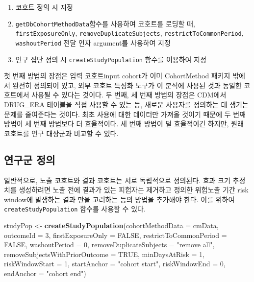 \documentclass[10.5pt]{book}
\newenvironment{Shaded}{\begin{snugshade}}{\end{snugshade}}
\newcommand{\KeywordTok}[1]{\textcolor[rgb]{0.13,0.29,0.53}{\textbf{#1}}}
\newcommand{\DataTypeTok}[1]{\textcolor[rgb]{0.13,0.29,0.53}{#1}}
\newcommand{\DecValTok}[1]{\textcolor[rgb]{0.00,0.00,0.81}{#1}}
\newcommand{\StringTok}[1]{\textcolor[rgb]{0.31,0.60,0.02}{#1}}
\newcommand{\OtherTok}[1]{\textcolor[rgb]{0.56,0.35,0.01}{#1}}
\newcommand{\NormalTok}[1]{#1}
\providecommand{\tightlist}{%
  \setlength{\itemsep}{0pt}\setlength{\parskip}{0pt}}
\theoremstyle{definition}
\theoremstyle{definition}
\theoremstyle{definition}
\theoremstyle{remark}
\begin{document}
\begin{enumerate}
\def\labelenumi{\arabic{enumi}.}
\tightlist
\item
  코호트 정의 시 지정
\item
  \texttt{getDbCohortMethodData}함수를 사용하여 코호트를 로딩할 때,
  \texttt{firstExposureOnly}, \texttt{removeDuplicateSubjects},
  \texttt{restrictToCommonPeriod}, \texttt{washoutPeriod} 전달 인자
  argument를 사용하여 지정
\item
  연구 집단 정의 시 \texttt{createStudyPopulation} 함수를 이용하여 지정
\end{enumerate}

첫 번째 방법의 장점은 입력 코호트input cohort가 이미 CohortMethod 패키지
밖에서 완전히 정의되어 있고, 외부 코호트 특성화 도구가 이 분석에 사용된
것과 동일한 코호트에서 사용될 수 있다는 것이다. 두 번째, 세 번째 방법의
장점은 CDM에서 DRUG\_ERA 테이블을 직접 사용할 수 있는 등, 새로운
사용자를 정의하는 데 생기는 문제를 줄여준다는 것이다. 최초 사용에 대한
데이터만 가져올 것이기 때문에 두 번째 방법이 세 번째 방법보다 더
효율적이다. 세 번째 방법이 덜 효율적이긴 하지만, 원래 코호트를 연구
대상군과 비교할 수 있다.

\subsection{연구군 정의}\label{-}

일반적으로, 노출 코호트와 결과 코호트는 서로 독립적으로 정의된다. 효과
크기 추정치를 생성하려면 노출 전에 결과가 있는 피험자는 제거하고 정의한
위험노출 기간 risk window에 발생하는 결과 만을 고려하는 등의 방법을
추가해야 한다. 이를 위하여 \texttt{createStudyPopulation} 함수를 사용할
수 있다.

\begin{Shaded}
\begin{Highlighting}[]
\NormalTok{studyPop <-}\StringTok{ }\KeywordTok{createStudyPopulation}\NormalTok{(}\DataTypeTok{cohortMethodData =}\NormalTok{ cmData,}
                                  \DataTypeTok{outcomeId =} \DecValTok{3}\NormalTok{,}
                                  \DataTypeTok{firstExposureOnly =} \OtherTok{FALSE}\NormalTok{,}
                                  \DataTypeTok{restrictToCommonPeriod =} \OtherTok{FALSE}\NormalTok{,}
                                  \DataTypeTok{washoutPeriod =} \DecValTok{0}\NormalTok{,}
                                  \DataTypeTok{removeDuplicateSubjects =} \StringTok{"remove all"}\NormalTok{,}
                                  \DataTypeTok{removeSubjectsWithPriorOutcome =} \OtherTok{TRUE}\NormalTok{,}
                                  \DataTypeTok{minDaysAtRisk =} \DecValTok{1}\NormalTok{,}
                                  \DataTypeTok{riskWindowStart =} \DecValTok{1}\NormalTok{,}
                                  \DataTypeTok{startAnchor =} \StringTok{"cohort start"}\NormalTok{,}
                                  \DataTypeTok{riskWindowEnd =} \DecValTok{0}\NormalTok{,}
                                  \DataTypeTok{endAnchor =} \StringTok{"cohort end"}\NormalTok{)}
\end{Highlighting}
\end{Shaded}
\end{document}
